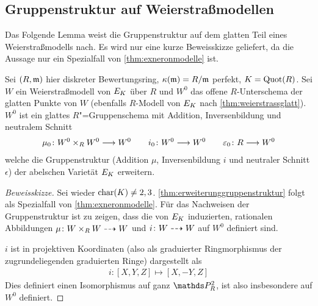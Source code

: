 \documentclass[german, bibliography=totoc]{scrreprt}
\renewcommand*{\optcite}[2][]{}
\begin{document}
\subsection{Gruppenstruktur auf Weierstraßmodellen}
Das Folgende Lemma weist die Gruppenstruktur auf dem glatten Teil
eines Weierstraßmodells nach. Es wird nur eine kurze Beweisskizze
geliefert, da die Aussage nur ein Spezialfall von
\ref{thm:exneronmodelle} ist.
\begin{Lemma}\label{thm:erweiterunggruppenstruktur}
  Sei $(R,\mathfrak{m})$ hier diskreter Bewertungsring,
  $\kappa(\mathfrak{m})=R/\mathfrak{m}$ perfekt,
  $K=\operatorname{Quot}(R)$.
  Sei $W$ ein Weierstraßmodell von $E_{K}$ über $R$ und
  $W^0$ das offene $R$-Unterschema der glatten Punkte von $W$ 
  (ebenfalls $R$-Modell von $E_{K}$ nach \ref{thm:weierstrassglatt}).
  $W^0$ ist ein glattes $R$"=Gruppenschema
  mit Addition, Inversenbildung und neutralem Schnitt
  \begin{gather*}
    \mu_0\colon W^0\times_R W^0 \longrightarrow W^0
    \qquad
    i_0\colon W^0\longrightarrow W^0
    \qquad
    \varepsilon_0\colon R\longrightarrow W^0
  \end{gather*}
  welche die Gruppenstruktur (Addition $\mu$, Inversenbildung $i$ und
  neutraler Schnitt $\epsilon$)
  der abelschen Varietät $E_{K}$ erweitern.
  \optcite[Theorem IV.5.3 (c)]{silverman2}

  
  \begin{proof}[Beweisskizze] Sei wieder $\operatorname{char}(K)\neq 2,3$.
    \ref{thm:erweiterunggruppenstruktur} folgt als Spezialfall von
    \ref{thm:exneronmodelle}.
    Für das Nachweisen der Gruppenstruktur ist zu zeigen, dass die von
    $E_{K}$ induzierten, rationalen Abbildungen $\mu\colon W\times_R
    W\dashrightarrow W$ und $i\colon W\dashrightarrow W$ auf $W^0$ definiert sind.

    $i$ ist in projektiven Koordinaten (also als graduierter
    Ringmorphismus der zugrundeliegenden graduierten Ringe)
    dargestellt als
    \begin{gather*}
      i\colon [X,Y,Z]\mapsto [X,-Y,Z]
    \end{gather*}
    Dies definiert einen Isomorphismus auf ganz $\P_R^2$, ist also
    insbesondere auf $W^0$ definiert.


\end{proof}
\end{Lemma}
\end{document}
